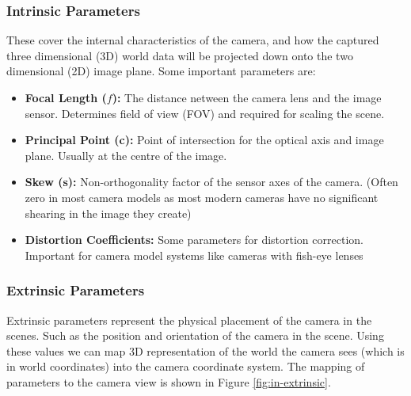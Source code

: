 \subsubsection{Intrinsic Parameters}\label{sec:intrinsic}
These cover the internal characteristics of the camera, and how the captured three dimensional (3D) world data will be projected down onto the two dimensional (2D) image plane. Some important parameters are:

\begin{itemize}
  \item \textbf{Focal Length ($f$):} The distance netween the camera lens and the image sensor. Determines field of view (FOV) and required for scaling the scene.
  \item \textbf{Principal Point (c):} Point of intersection for the optical axis and image plane. Usually at the centre of the image.
  \item \textbf{Skew (s):} Non-orthogonality factor of the sensor axes of the camera. (Often zero in most camera models as most modern cameras have no significant shearing in the image they create)
  \item \textbf{Distortion Coefficients:} Some parameters for distortion correction. Important for camera model systems like cameras with fish-eye lenses \cite{king1989history}
\end{itemize}

\subsubsection{Extrinsic Parameters}
Extrinsic parameters represent the physical placement of the camera in the scenes. Such as the position and orientation of the camera in the scene. Using these values we can map  3D representation of the world the camera sees (which is in world coordinates) into the camera coordinate system. The mapping of parameters to the camera view is shown in Figure \ref{fig:in-extrinsic}.

